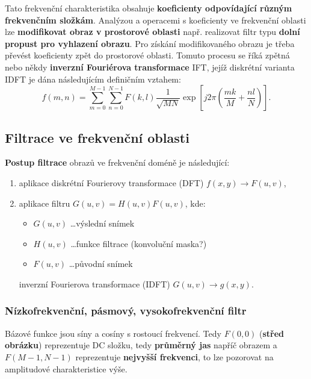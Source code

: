 Tato frekvenční charakteristika obsahuje \textbf{koeficienty odpovídající různým frekvenčním složkám}. Analýzou a operacemi s koeficienty ve frekvenční oblasti lze \textbf{modifikovat obraz v prostorové oblasti} např. realizovat filtr typu \textbf{dolní propust pro vyhlazení obrazu}. Pro získání modifikovaného obrazu je třeba převést koeficienty zpět do prostorové oblasti. Tomuto procesu se říká zpětná nebo někdy \textbf{inverzní Fouriérova transformace} IFT, jejíž diskrétní varianta IDFT je dána následujícím definičním vztahem:
\begin{equation*}
f(m, n) = \sum_{m = 0}^{M - 1}\sum_{n = 0}^{N - 1} F(k, l) \frac{1}{\sqrt{MN}} \exp \left[ j2\pi \left( \frac{mk}{M} + \frac{nl}{N} \right) \right].
\end{equation*}

\subsection{Filtrace ve frekvenční oblasti}
\textbf{Postup filtrace} obrazů ve frekvenční doméně je následující:
\begin{enumerate}
\item aplikace diskrétní Fourierovy transformace (DFT) $f(x, y) \rightarrow F(u, v)$,
\item aplikace filtru $G(u, v) = H(u, v) F(u, v)$, kde:
\begin{itemize}
\item $G(u, v)$ \ldots výslední snímek
\item $H(u, v)$ \ldots funkce filtrace (konvoluční maska?)
\item $F(u, v)$ \ldots původní snímek
\end{itemize}
inverzní Fourierova transformace (IDFT) $G(u, v) \rightarrow g(x, y)$.
\end{enumerate}

\subsubsection{Nízkofrekvenční, pásmový, vysokofrekvenční filtr}
Bázové funkce jsou síny a cosíny s rostoucí frekvencí. Tedy $ F(0, 0) $ (\textbf{střed obrázku}) reprezentuje DC složku, tedy \textbf{průměrný jas} napříč obrazem a $F(M -1, N - 1)$ reprezentuje \textbf{nejvyšší frekvenci}, to lze pozorovat na amplitudové charakteristice výše. 

